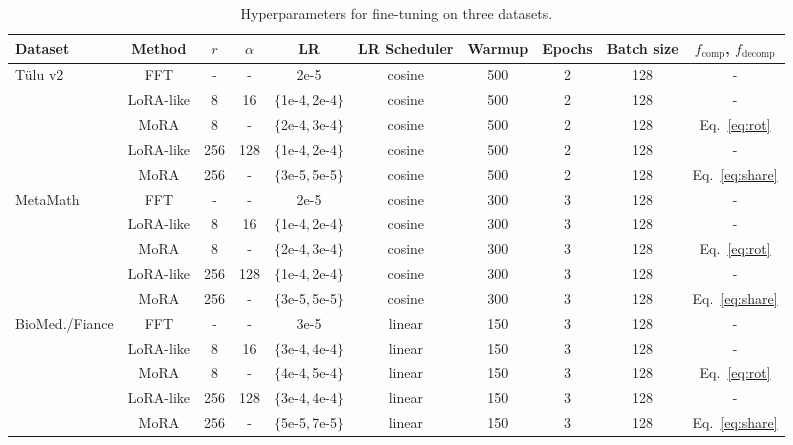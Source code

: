 \documentclass[11pt]{article}
\begin{document}
\begin{table}[h]
  \small
\centering
\begin{tabular}{lccccccccc}
\toprule
Dataset                   & Method    & $r$ & $\alpha$ & LR                  & LR Scheduler & Warmup & Epochs & Batch size & $f_{\text{comp}}$, $f_{\text{decomp}}$  \\ \midrule
\multirow{5}{*}{Tülu v2}  & FFT       & -   & -   & 2e-5                & cosine       & 500    & 2      & 128        & -  \\
                          & LoRA-like & 8   & 16  & $\{$1e-4$,$2e-4$\}$ & cosine       & 500    & 2      & 128        & - \\
                          & MoRA      & 8   & -   & $\{$2e-4$,$3e-4$\}$ & cosine       & 500    & 2      & 128        & Eq.~\ref{eq:rot} \\
                          & LoRA-like & 256 & 128 & $\{$1e-4$,$2e-4$\}$ & cosine       & 500    & 2      & 128        & -\\
                          & MoRA      & 256 & -   & $\{$3e-5$,$5e-5$\}$ & cosine       & 500    & 2      & 128        & Eq.~\ref{eq:share} \\
\midrule
\multirow{5}{*}{MetaMath} & FFT       & -   & -   & 2e-5                & cosine       & 300    & 3      & 128        & -  \\
                          & LoRA-like & 8   & 16  & $\{$1e-4$,$2e-4$\}$ & cosine       & 300    & 3      & 128        & - \\
                          & MoRA      & 8   & -   & $\{$2e-4$,$3e-4$\}$ & cosine       & 300    & 3      & 128        & Eq.~\ref{eq:rot} \\
                          & LoRA-like & 256 & 128 & $\{$1e-4$,$2e-4$\}$ & cosine       & 300    & 3      & 128        & -\\
                          & MoRA      & 256 & -   & $\{$3e-5$,$5e-5$\}$ & cosine       & 300    & 3      & 128        & Eq.~\ref{eq:share} \\
\midrule
\multirow{5}{*}{BioMed./Fiance}   & FFT       & -   & -   & 3e-5                & linear       & 150    & 3      & 128        & -  \\
                          & LoRA-like & 8   & 16  & $\{$3e-4$,$4e-4$\}$ & linear       & 150    & 3      & 128        & - \\
                          & MoRA      & 8   & -   & $\{$4e-4$,$5e-4$\}$ & linear       & 150    & 3      & 128        & Eq.~\ref{eq:rot} \\
                          & LoRA-like & 256 & 128 & $\{$3e-4$,$4e-4$\}$ & linear       & 150    & 3      & 128        & -\\
                          & MoRA      & 256 & -   & $\{$5e-5$,$7e-5$\}$ & linear       & 150    & 3      & 128        & Eq.~\ref{eq:share} \\
\bottomrule
\end{tabular}
\caption{Hyperparameters for fine-tuning on three datasets.}
\label{table:fine-tune-settings}
\end{table}
\end{document}
